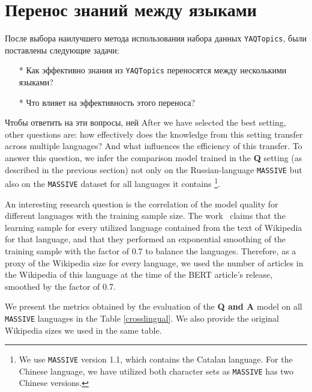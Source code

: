 \section{Перенос знаний между языками} 

После выбора наилучшего метода использования набора данных \texttt{YAQTopics}, были поставлены следующие задачи:

\begin{itemize}
\item[*]Как эффективно знания из \texttt{YAQTopics} переносятся между несколькими языками?
\item[*]Что влияет на эффективность этого переноса?
\end{itemize}

Чтобы ответить на эти вопросы, ней
After we have selected the best setting, other questions are: how effectively does the knowledge from this setting transfer across multiple languages? And what influences the efficiency of this transfer. To answer this question, we infer the comparison model trained in the \textbf{Q} setting (as described in the previous section) not only on the Russian-language \texttt{MASSIVE} but also on the \texttt{MASSIVE} dataset for all languages it contains \footnote{We use \texttt{MASSIVE} version 1.1, which contains the Catalan language. For the Chinese language, we have utilized both character sets as \texttt{MASSIVE} has two Chinese versions.}. 

An interesting research question is the correlation of the model quality for different languages with the training sample size. The work~\cite{bert} claims that the learning sample for every utilized language contained from the text of Wikipedia for that language, and that they performed an exponential smoothing of the training sample with the factor of 0.7 to balance the languages. Therefore, as a proxy of the Wikipedia size for every language, we used the number of articles in the Wikipedia of this language at the time of the BERT article's release, smoothed by the factor of 0.7. 

We present the metrics obtained by the evaluation of the \textbf{Q and A} model on all \texttt{MASSIVE} languages in the Table \ref{crosslingual}. We also provide the original Wikipedia sizes we used in the same table. 

